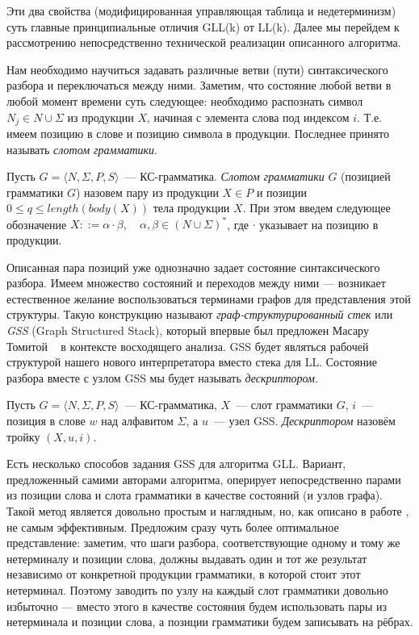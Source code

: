 Эти два свойства (модифицированная управляющая таблица и недетерминизм) суть главные принципиальные отличия GLL(k) от LL(k). Далее мы перейдем к рассмотрению непосредственно технической реализации описанного алгоритма.

Нам необходимо научиться задавать различные ветви (пути) синтаксического разбора и переключаться между ними. Заметим, что состояние любой ветви в любой момент времени суть следующее: необходимо распознать символ $N_j \in N \cup \Sigma$ из продукции $X$, начиная с элемента слова под индексом $i$. Т.е. имеем позицию в слове и позицию символа в продукции. Последнее принято называть \textit{слотом грамматики}.

\begin{definition}
  Пусть $G = \langle N, \Sigma, P, S \rangle$~--- КС-грамматика. \textit{Слотом грамматики} $G$ (позицией грамматики $G$) назовем пару из продукции $X \in P$ и позиции $0 \leq q \leq length(body(X))$ тела продукции $X$. При этом введем следующее обозначение $X ::= \alpha \cdot \beta, \quad \alpha,\beta \in (N \cup \Sigma)^*$, где $ \cdot $ указывает на позицию в продукции.
\end{definition}

Описанная пара позиций уже однозначно задает состояние синтаксического разбора. Имеем множество состояний и переходов между ними --- возникает естественное желание воспользоваться терминами графов для представления этой структуры. Такую конструкцию называют \textit{граф-структурированный стек} или \textit{GSS} (Graph Structured Stack), который впервые был предложен Масару Томитой ~\cite{tomita1988graph} в контексте восходящего анализа. GSS будет являться рабочей структурой нашего нового интерпретатора вместо стека для LL. Состояние разбора вместе с узлом GSS мы будет называть \textit{дескриптором}.

\begin{definition}
  Пусть $G = \langle N, \Sigma, P, S \rangle$~--- КС-грамматика, $X$~--- слот грамматики $G$, $i$~--- позиция в слове $ w $ над алфавитом $\Sigma$, а $ u $~--- узел GSS. \textit{Дескриптором} назовём тройку $ (X, u, i) $.
\end{definition}

Есть несколько способов задания GSS для алгоритма GLL. Вариант, предложенный самими авторами алгоритма, оперирует непосредственно парами из позиции слова и слота грамматики в качестве состояний (и узлов графа). Такой метод является довольно простым и наглядным, но, как описано в работе \cite{10.1007/978-3-662-46663-6_5}, не самым эффективным. Предложим сразу чуть более оптимальное представление: заметим, что шаги разбора, соответствующие одному и тому же нетерминалу и позиции слова, должны выдавать один и тот же результат независимо от конкретной продукции грамматики, в которой стоит этот нетерминал. Поэтому заводить по узлу на каждый слот грамматики довольно избыточно --- вместо этого в качестве состояния будем использовать пары из нетерминала и позиции слова, а позиции грамматики будем записывать на рёбрах.

